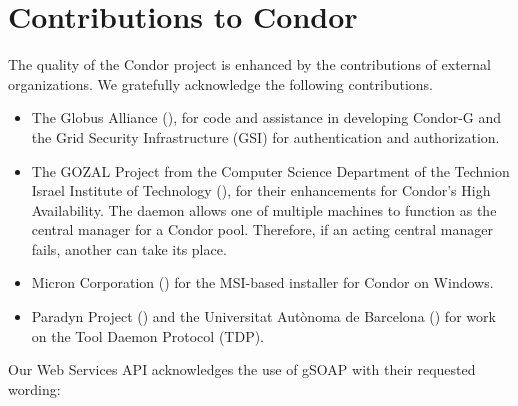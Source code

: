 \section{\label{sec:contributions}Contributions to Condor}

The quality of the Condor project is enhanced by the contributions
of external organizations.
We gratefully acknowledge the following contributions. 

\begin{itemize}

\item{The Globus Alliance} (), 
for code and assistance in developing Condor-G
and the Grid Security Infrastructure (GSI)
for authentication and authorization. 

\item{The GOZAL Project}
from the Computer Science Department
of the Technion Israel Institute of Technology
(),
for their enhancements for Condor's High Availability.
The  daemon allows one of multiple machines to function
as the central manager for a Condor pool.
Therefore, if an acting central manager fails,
another can take its place.


\item{Micron Corporation} ()
for the MSI-based installer for Condor on Windows.

\item{Paradyn Project} ()
and the Universitat Aut\`{o}noma de Barcelona
() for work on the Tool Daemon Protocol (TDP).

\end{itemize}

Our Web Services API acknowledges the use of gSOAP with their
requested wording:

